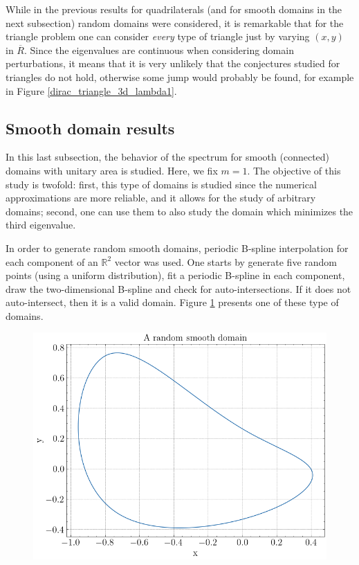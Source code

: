 While in the previous results for quadrilaterals (and for smooth domains in the next subsection) random domains were considered, it is remarkable that for the triangle problem one can consider \textit{every} type of triangle just by varying \((x,y)\) in \(\overline{R}\). Since the eigenvalues are continuous when considering domain perturbations, it means that it is very unlikely that the conjectures studied for triangles do not hold, otherwise some jump would probably be found, for example in Figure \ref{dirac_triangle_3d_lambda1}. 


\subsection{Smooth domain results}

In this last subsection, the behavior of the spectrum for smooth (connected) domains with unitary area is studied. Here, we fix \(m=1\). The objective of this study is twofold: first, this type of domains is studied since the numerical approximations are more reliable, and it allows for the study of arbitrary domains; second, one can use them to also study the domain which minimizes the third eigenvalue.

In order to generate random smooth domains, periodic B-spline interpolation for each component of an \(\mathbb{R}^2\) vector was used. One starts by generate five random points (using a uniform distribution), fit a periodic B-spline in each component, draw the two-dimensional B-spline and check for auto-intersections. If it does not auto-intersect, then it is a valid domain. Figure \ref{dirac_smooth_random_domain} presents one of these type of domains.

\begin{figure}[!htb]
    \centering
    \includegraphics[width=0.55\linewidth]{Images/Dirac/smooth/random_smooth_domain.png}
    \label{dirac_smooth_random_domain}
\end{figure}


